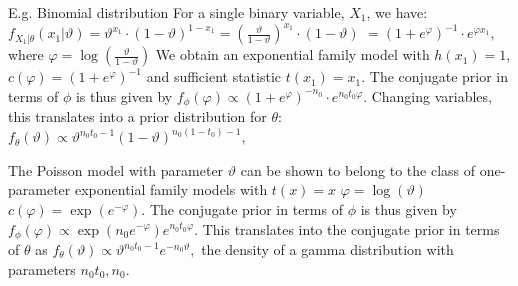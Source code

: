E.g. Binomial distribution
For a single binary variable, \( X_1 \), we have:
\(
f_{X_1|\theta}(x_1|\vartheta) = \vartheta^{x_1} \cdot (1 - \vartheta)^{1-x_1} = \left(\frac{\vartheta}{1-\vartheta}\right)^{x_1} \cdot (1 - \vartheta)
\)
\(
= (1 + e^{\varphi})^{-1} \cdot e^{\varphi x_1},
\)
where \( \varphi = \log \left( \frac{\vartheta}{1-\vartheta} \right) \)
We obtain an exponential family model with \( h(x_1) = 1 \), \( c(\varphi) = (1 + e^{\varphi})^{-1} \) and sufficient statistic \( t(x_1) = x_1 \).
The conjugate prior in terms of \( \phi \) is thus given by
\(
f_{\phi}(\varphi) \propto (1 + e^{\varphi})^{-n_0} \cdot e^{n_0 t_0 \varphi}.
\)
Changing variables, this translates into a prior distribution for \( \theta \):
\(
f_{\theta}(\vartheta) \propto \vartheta^{n_0 t_0 -1} (1 - \vartheta)^{n_0(1-t_0)-1},
\)

The Poisson model with parameter \( \vartheta \) can be shown to belong to the class of one-parameter exponential family models with
\( t(x) = x \)
\( \varphi = \log(\vartheta) \)
\( c(\varphi) = \exp(e^{-\varphi}) \).
The conjugate prior in terms of \( \phi \) is thus given by
\(
f_{\phi}(\varphi) \propto \exp(n_0 e^{-\varphi}) e^{n_0 t_0 \varphi}.
\)
This translates into the conjugate prior in terms of \( \theta \) as
\(
f_{\theta}(\vartheta) \propto \vartheta^{n_0 t_0 - 1} e^{-n_0 \vartheta},
\)
the density of a gamma distribution with parameters \( n_0 t_0, n_0 \).
